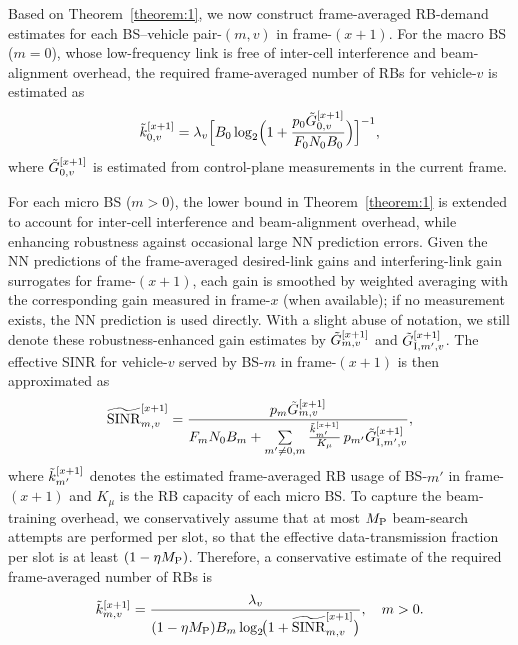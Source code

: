 \documentclass[10pt,journal,letterpaper]{IEEEtran}
\newcommand{\rev}[1]{\textcolor{revisioncolor}{{}#1}}
\newcommand{\omitted}[1]{}
\theoremstyle{remark}
\begin{document}
Based on Theorem~\ref{theorem:1}, we now construct frame-averaged RB-demand estimates for each BS–vehicle pair-$(m,v)$ in frame-$(x\!+\!1)$.
For the macro BS ($m=0$), whose low-frequency link is free of inter-cell interference and beam-alignment overhead, the required frame-averaged number of RBs for vehicle-$v$ is estimated as 
\begin{equation}
\label{eq:RB_demand_hat_macro}
    \Tilde{k}_{0,v}^{[x+1]}
    = \lambda_v
      \Bigl[
        B_0 \log_2 \Bigl(
        1 + \frac{ p_0 \Tilde{G}_{0,v}^{[x+1]}}{F_0 N_0 B_0}
        \Bigr)
      \Bigr]^{-1},
\end{equation}
where $\Tilde{G}_{0,v}^{[x+1]}$ is estimated from control-plane measurements in the current frame.

For each micro BS ($m>0$), the lower bound in Theorem~\ref{theorem:1} is extended to account for inter-cell interference and beam-alignment overhead, while enhancing robustness against occasional large NN prediction errors. \omitted{}\rev{Given the NN predictions of the frame-averaged desired-link gains and interfering-link gain surrogates} for frame-$(x\!+\!1)$, each gain is smoothed by weighted averaging with the corresponding gain measured in frame-$x$ (when available); if no measurement exists, the NN prediction is used directly. With a slight abuse of notation, we still denote these robustness-enhanced gain estimates by $\Tilde{G}_{m,v}^{[x+1]}$ and $\Tilde{G}_{{\rm I},m',v}^{[x+1]}$. The effective SINR for vehicle-$v$ served by BS-$m$ in frame-$(x\!+\!1)$ is then approximated as
\begin{equation}
\label{eq:eff_SINR_hat}
    \widetilde{\mathrm{SINR}}_{m,v}^{[x+1]}
    = \frac{p_m \Tilde{G}_{m,v}^{[x+1]}}
           {F_m N_0 B_m
            + \sum\limits_{m'\neq 0,m}
              \frac{\Tilde{k}_{m'}^{[x+1]}}{K_\mu}\, p_{m'} \Tilde{G}_{{\rm I},m',v}^{[x+1]}},
\end{equation}
where $\Tilde{k}_{m'}^{[x+1]}$ denotes the estimated frame-averaged RB usage of BS-$m'$ in frame-$(x\!+\!1)$ and $K_\mu$ is the RB capacity of each micro BS. To capture the beam-training overhead, we conservatively assume that at most $M_{\rm P}$ beam-search attempts are performed per slot, so that the effective data-transmission fraction per slot is\rev{ at least} $(1-\eta M_{\rm P})$. Therefore, a conservative estimate of the required frame-averaged number of RBs is
\begin{equation}
\label{eq:RB_demand_hat}
    \Tilde{k}_{m,v}^{[x+1]}
    = \frac{\lambda_v}{(1-\eta M_{\rm P}) B_m \log_2\!\bigl(1+\widetilde{\mathrm{SINR}}_{m,v}^{[x+1]}\bigr)},
    \quad m>0.
\end{equation}
\end{document}
